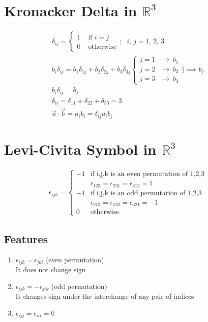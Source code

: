 \documentclass[a4paper, 11pt, normalem]{report}
\newcommand\R{\mathbb{R}}
\begin{document}
\section{Kronacker Delta in $\R^{3}$}
\begin{gather*}
    \delta_{ij} =
    \begin{cases}
        1 & \text{ if } i = j \\
        0 & \text{ otherwise}
    \end{cases}
    ;~~~ i,\,j = 1,\,2,\,3 \\
    b_{i}\delta_{ij} = b_{1}\delta_{1j} + b_{2}\delta_{2j} + b_{3}\delta_{3j}
    \begin{cases}
        j = 1 & \to ~ b_{1} \\
        j = 2 & \to ~ b_{2} \\
        j = 3 & \to ~ b_{3}
    \end{cases}
    \Bigg\} \implies b_{j} \\
    b_{i}\delta_{ij} = b_{j} \\
    \delta_{ii} = \delta_{11} + \delta_{22} + \delta_{33} = 3 \\
    \vec{a} \cdot \vec{b} = a_{i}b_{i} = \delta_{ij}a_{i}b_{j}
\end{gather*}

\section{Levi-Civita Symbol in $\R^3$}
\begin{gather*}
    \epsilon_{ijk} =
    \begin{cases}
        +1 & \text{if i,j,k is an even permutation of 1,2,3}       \\
           & \epsilon_{123} = \epsilon_{231} = \epsilon_{312} = 1  \\
        -1 & \text{if i,j,k is an odd permutation of 1,2,3}        \\
           & \epsilon_{213} = \epsilon_{132} = \epsilon_{321} = -1 \\
        0  & \text{otherwise}
    \end{cases}
\end{gather*}
\subsection{Features}
\begin{enumerate}
    \item $\epsilon_{ijk} = \epsilon_{jki}$ (even permutation) \\
          It does not change sign
    \item $\epsilon_{ijk} = -\epsilon_{jik}$ (odd permutation) \\
          It changes sign under the interchange of any pair of indices
    \item $\epsilon_{ijj} = \epsilon_{iii} = 0$
\end{enumerate}
\end{document}

